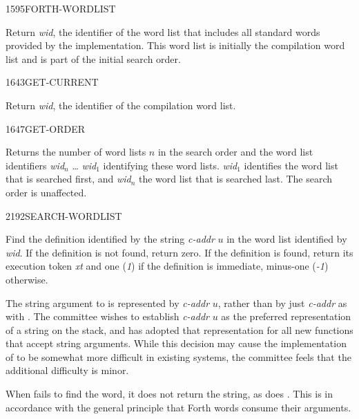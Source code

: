\begin{newword}{1595}{FORTH-WORDLIST}

	Return \emph{wid}, the identifier of the word list that includes
	all standard words provided by the implementation. This word list
	is initially the compilation word list and is part of the initial
	search order.
\end{newword}


\begin{newword}{1643}{GET-CURRENT}

	Return \emph{wid}, the identifier of the compilation word list.
\end{newword}


\begin{newword}{1647}{GET-ORDER}

	Returns the number of word lists $n$ in the search order and the
	word list identifiers \emph{wid}$_n$ {\ldots} \emph{wid}$_1$
	identifying these word lists. \emph{wid}$_1$ identifies the word
	list that is searched first, and \emph{wid}$_n$ the word list
	that is searched last. The search order is unaffected.
\end{newword}


\begin{newword}{2192}{SEARCH-WORDLIST}

	Find the definition identified by the string \emph{c-addr} $u$ in
	the word list identified by \emph{wid}. If the definition is not
	found, return zero. If the definition is found, return its
	execution token \emph{xt} and one (\emph{1}) if the definition is
	immediate, minus-one (\emph{-1}) otherwise.

	\begin{rationale} %
		The string argument to  is represented
		by \emph{c-addr} $u$, rather than by just \emph{c-addr} as
		with . The committee wishes to establish
		\emph{c-addr} $u$ as the preferred representation of a string
		on the stack, and has adopted that representation for all new
		functions that accept string arguments. While this decision
		may cause the implementation of  to be
		somewhat more difficult in existing systems, the committee
		feels that the additional difficulty is minor.

		When  fails to find the word, it does
		not return the string, as does . This is in
		accordance with the general principle that Forth words consume
		their arguments.
	\end{rationale}
\end{newword}


